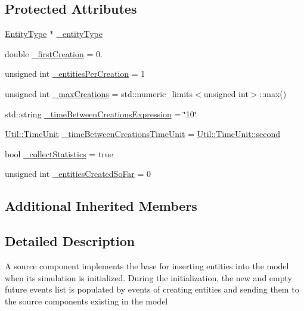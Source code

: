 \subsection*{Protected Attributes}
\begin{DoxyCompactItemize}
\item 
\hyperlink{class_entity_type}{Entity\+Type} $\ast$ \hyperlink{class_source_model_component_a564b2c74f5273f8f092d92a5800456cf}{\+\_\+entity\+Type}
\item 
double \hyperlink{class_source_model_component_ad58dddde2b6a81d85f261fa8a11243b3}{\+\_\+first\+Creation} = 0.
\item 
unsigned int \hyperlink{class_source_model_component_a68b0576903281a4716eb3ea0281dd133}{\+\_\+entities\+Per\+Creation} = 1
\item 
unsigned int \hyperlink{class_source_model_component_a99525d31bdc32efd5bbdcfbbbf115ec5}{\+\_\+max\+Creations} = std\+::numeric\+\_\+limits$<$unsigned int$>$\+::max()
\item 
std\+::string \hyperlink{class_source_model_component_ab0c96af4d61d8125773fa41cff865211}{\+\_\+time\+Between\+Creations\+Expression} = \char`\"{}10\char`\"{}
\item 
\hyperlink{class_util_a28504cc2fecc9aa47154cba4e625ec6f}{Util\+::\+Time\+Unit} \hyperlink{class_source_model_component_af34df20551bc223eb103ca87e9f1463e}{\+\_\+time\+Between\+Creations\+Time\+Unit} = \hyperlink{class_util_a28504cc2fecc9aa47154cba4e625ec6faa9f0e61a137d86aa9db53465e0801612}{Util\+::\+Time\+Unit\+::second}
\item 
bool \hyperlink{class_source_model_component_ac0c009ff9a2e8169d251118dabcd19eb}{\+\_\+collect\+Statistics} = true
\item 
unsigned int \hyperlink{class_source_model_component_af1f4fb38d2c0c4ac08235d7aec131bc9}{\+\_\+entities\+Created\+So\+Far} = 0
\end{DoxyCompactItemize}
\subsection*{Additional Inherited Members}


\subsection{Detailed Description}
A source component implements the base for inserting entities into the model when its simulation is initialized. During the initialization, the new and empty future events list is populated by events of creating entities and sending them to the source components existing in the model 

